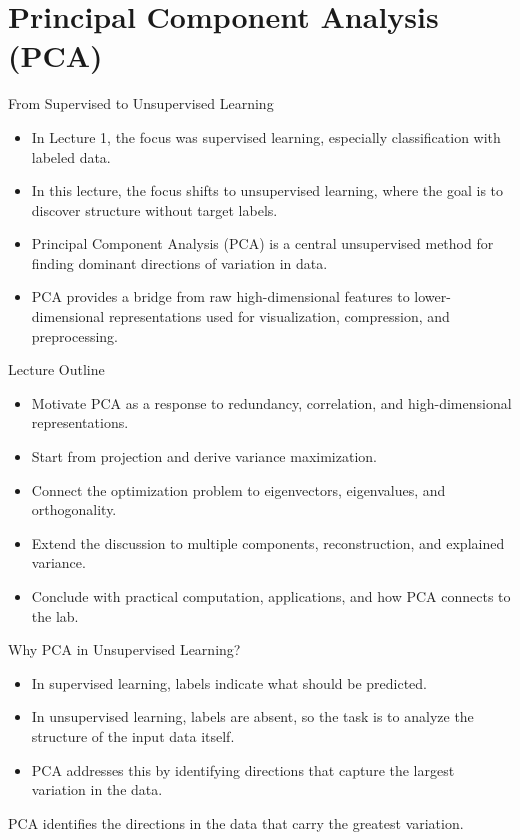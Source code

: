 \section{Principal Component Analysis (PCA)}

\begin{frame}{From Supervised to Unsupervised Learning}
\begin{itemize}
  \pause
  \item In Lecture 1, the focus was supervised learning, especially classification with labeled data.
  \pause
  \item In this lecture, the focus shifts to unsupervised learning, where the goal is to discover structure without target labels.
  \pause
  \item Principal Component Analysis (PCA) is a central unsupervised method for finding dominant directions of variation in data.
  \pause
  \item PCA provides a bridge from raw high-dimensional features to lower-dimensional representations used for visualization, compression, and preprocessing.
\end{itemize}
\end{frame}

\begin{frame}{Lecture Outline}
\begin{itemize}
  \pause
  \item Motivate PCA as a response to redundancy, correlation, and high-dimensional representations.
  \pause
  \item Start from projection and derive variance maximization.
  \pause
  \item Connect the optimization problem to eigenvectors, eigenvalues, and orthogonality.
  \pause
  \item Extend the discussion to multiple components, reconstruction, and explained variance.
  \pause
  \item Conclude with practical computation, applications, and how PCA connects to the lab.
\end{itemize}
\end{frame}

\begin{frame}{Why PCA in Unsupervised Learning?}
\begin{itemize}
  \item In supervised learning, labels indicate what should be predicted.
  \pause
  \item In unsupervised learning, labels are absent, so the task is to analyze the structure of the input data itself.
  \pause
  \item PCA addresses this by identifying directions that capture the largest variation in the data.
\end{itemize}

\pause
\begin{rlintuition}
PCA identifies the directions in the data that carry the greatest variation.
\end{rlintuition}
\end{frame}

